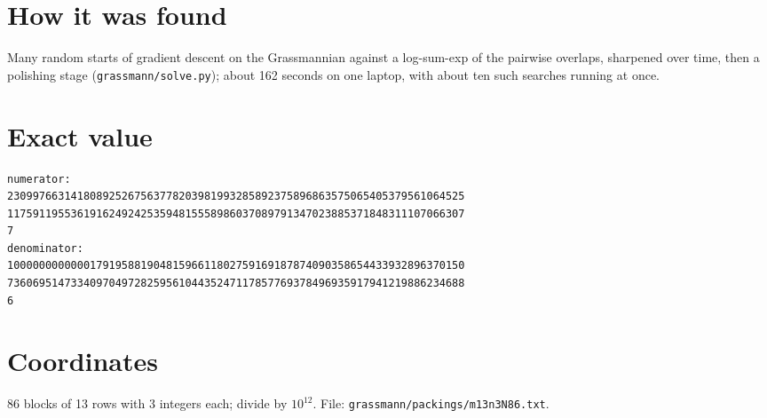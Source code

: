 \documentclass[11pt,a4paper]{article}
\begin{document}
\section{How it was found}
Many random starts of gradient descent on the Grassmannian against a log-sum-exp of the pairwise overlaps, sharpened over time, then a polishing stage (\texttt{grassmann/solve.py}); about 162 seconds on one laptop, with about ten such searches running at once.


\appendix
\section{Exact value}
{\small
\begin{verbatim}
numerator:
230997663141808925267563778203981993285892375896863575065405379561064525
117591195536191624924253594815558986037089791347023885371848311107066307
7
denominator:
100000000000017919588190481596611802759169187874090358654433932896370150
736069514733409704972825956104435247117857769378496935917941219886234688
6
\end{verbatim}}

\section{Coordinates}
86 blocks of 13 rows with 3 integers each; divide by $10^{12}$. File: \texttt{grassmann/packings/m13n3N86.txt}.
{\tiny
\begin{multicols}{3}
\end{multicols}}
\end{document}
